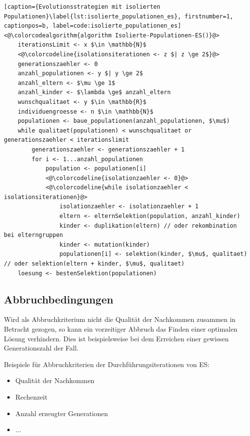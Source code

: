 \begin{lstlisting}[caption={Evolutionsstrategien mit isolierten Populationen}\label{lst:isolierte_populationen_es}, firstnumber=1, captionpos=b, label=code:isolierte_populationen_es]
<@\colorcodealgorithm{algorithm Isolierte-Populationen-ES()}@>
	iterationsLimit <- x $\in \mathbb{N}$
	<@\colorcodeline{isolationsiterationen <- z $| z \ge 2$}@>
	generationszaehler <- 0
	anzahl_populationen <- y $| y \ge 2$
	anzahl_eltern <- $\mu \ge 1$
	anzahl_kinder <- $\lambda \ge$ anzahl_eltern
	wunschqualitaet <- y $\in \mathbb{R}$
	individuengroesse <- n $\in \mathbb{N}$
	populationen <- baue_populationen(anzahl_populationen, $\mu$)
	while qualitaet(populationen) < wunschqualitaet or generationszaehler < iterationslimit
		generationszaehler <- generationszaehler + 1
		for i <- 1...anzahl_populationen
			population <- populationen[i]
			<@\colorcodeline{isolationzaehler <- 0}@>
			<@\colorcodeline{while isolationzaehler < isolationsiterationen}@>
				isolationzaehler <- isolationzaehler + 1
				eltern <- elternSelektion(population, anzahl_kinder)
				kinder <- duplikation(eltern) // oder rekombination bei elterngruppen
				kinder <- mutation(kinder)
				populationen[i] <- selektion(kinder, $\mu$, qualitaet) // oder selektion(eltern + kinder, $\mu$, qualitaet)
	loesung <- bestenSelektion(populationen)
\end{lstlisting}

\subsection{Abbruchbedingungen}

Wird als Abbruchkriterium nicht die Qualität der Nachkommen zusammen in Betracht gezogen, so kann ein vorzeitiger Abbruch das Finden einer optimalen Lösung verhindern.
Dies ist beispielsweise bei dem Erreichen einer gewissen Generationszahl der Fall.

Beispiele für Abbruchkriterien der Durchführungsiterationen von ES:
\begin{itemize}
	\item Qualität der Nachkommen
	\item Rechenzeit
	\item Anzahl erzeugter Generationen
	\item ...
\end{itemize}
